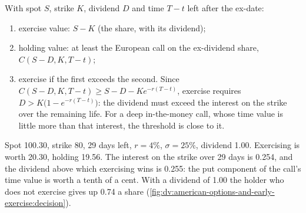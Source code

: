 \begin{method}\label{met:dv:american-options-and-early-exercise:decision}
With spot $S$, strike $K$, dividend $D$ and time $T-t$ left after the ex-date:
\begin{enumerate}
\item exercise value: $S-K$ (the share, with its dividend);
\item holding value: at least the European call on the ex-dividend share,
$C(S-D,K,T-t)$;
\item exercise if the first exceeds the second. Since $C(S-D,K,T-t)\ge S-D-Ke^{-r(T-t)}$,
exercise requires $D>K\bigl(1-e^{-r(T-t)}\bigr)$: the dividend must exceed the interest
on the strike over the remaining life. For a deep in-the-money call, whose time value is
little more than that interest, the threshold is close to it.
\end{enumerate}
\end{method}

\begin{example}\label{ex:dv:american-options-and-early-exercise:night}
Spot 100.30, strike 80, 29 days left, $r=4\%$, $\sigma=25\%$, dividend 1.00. Exercising is
worth 20.30, holding 19.56. The interest on the strike over 29 days is 0.254, and the
dividend above which exercising wins is 0.255: the put component of the call's time
value is worth a tenth of a cent. With a dividend of 1.00 the holder who does not
exercise gives up 0.74 a share (\cref{fig:dv:american-options-and-early-exercise:decision}).
\end{example}

\begin{omfigure}

\label{fig:dv:american-options-and-early-exercise:decision}
\end{omfigure}

